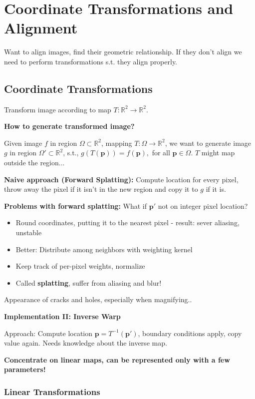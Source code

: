 \chapter{Coordinate Transformations and Alignment}
Want to align images, find their geometric relationship. If they don't align we need to perform transformations s.t. they align properly.

\section{Coordinate Transformations}

Transform image according to map $T : \mathbb{R}^2 \rightarrow \mathbb{R}^2$.

\textbf{How to generate transformed image?}

Given image $f$ in region $\Omega \subset \mathbb{R}^2$, mapping $T: \Omega \rightarrow \mathbb{R}^2$, we want to generate image $g$ in region $\Omega' \subset \mathbb{R}^2$, s.t., $g(T(\mathbf{p})) = f(\mathbf{p}), $ for all $\mathbf{p} \in \Omega$. $T$ might map outside the region...

\textbf{Naive approach (Forward Splatting):} Compute location for every pixel, throw away the pixel if it isn't in the new region and copy it to $g$ if it is.

\textbf{Problems with forward splatting:} What if $\mathbf{p'}$ not on integer pixel location?

\begin{itemize}
    \item Round coordinates, putting it to the nearest pixel - result: sever aliasing, unstable
    \item Better: Distribute among neighbors with weighting kernel
    \item Keep track of per-pixel weights, normalize
    \item Called \textbf{splatting}, suffer from aliasing and blur!
\end{itemize}

Appearance of cracks and holes, especially when magnifying..

\textbf{Implementation II: Inverse Warp}

Approach: Compute location $\mathbf{p} = T^{-1}(\mathbf{p'})$, boundary conditions apply, copy value again. Needs knowledge about the inverse map.

\textbf{Concentrate on linear maps, can be represented only with a few parameters!}

\subsection{Linear Transformations}

